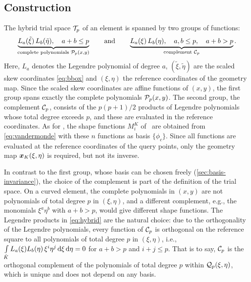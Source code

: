 \subsection{Construction}
\label{sec:hybrid-definition}
%
The hybrid trial space $\mathcal T_p$ of an element is spanned by two groups of functions:
%
\begin{equation}
  \underbrace{L_a(\tilde\xi)\,L_b(\tilde\eta),\quad a+b\le p}_{\text{complete polynomials }\mathcal P_p(x,y)}
  \qquad\text{and}\qquad
  \underbrace{L_a(\xi)\,L_b(\eta),\quad a,b\le p,\quad a+b>p}_{\text{complement }\mathcal C_p} .
  \label{eq:hybrid}
\end{equation}
%
Here, $L_a$ denotes the Legendre polynomial of degree $a$, $(\tilde\xi,\tilde\eta)$ are the scaled skew coordinates \cref{eq:bbox} and $(\xi,\eta)$ the reference coordinates of the geometry map. Since the scaled skew coordinates are affine functions of $(x,y)$, the first group spans exactly the complete polynomials $\mathcal P_p(x,y)$. The second group, the complement $\mathcal C_p$, consists of the $p(p+1)/2$ products of Legendre polynomials whose total degree exceeds $p$, and these are evaluated in the reference coordinates. As for \PM, the shape functions $M_i^K$ of \PH\ are obtained from \cref{eq:vandermonde} with these $n$ functions as basis $\{\phi_c\}$. Since all functions are evaluated at the reference coordinates of the query points, only the geometry map $\bm{x}_K(\xi,\eta)$ is required, but not its inverse.

In contrast to the first group, whose basis can be chosen freely (\cref{sec:basis-invariance}), the choice of the complement is part of the definition of the trial space. On a curved element, the complete polynomials in $(x,y)$ are not polynomials of total degree $p$ in $(\xi,\eta)$, and a different complement, e.g., the monomials $\xi^a\eta^b$ with $a+b>p$, would give different shape functions. The Legendre products in \cref{eq:hybrid} are the natural choice: due to the orthogonality of the Legendre polynomials, every function of $\mathcal C_p$ is orthogonal on the reference square to all polynomials of total degree $p$ in $(\xi,\eta)$, i.e., $\int\limits_{\hat K}L_a(\xi)L_b(\eta)\,\xi^i\eta^j\mathop{}\!\mathrm{d}\xi\mathop{}\!\mathrm{d}\eta=0$ for $a+b>p$ and $i+j\le p$. That is to say, $\mathcal C_p$ is the orthogonal complement of the polynomials of total degree $p$ within $\mathcal Q_p(\xi,\eta)$, which is unique and does not depend on any basis.
%
